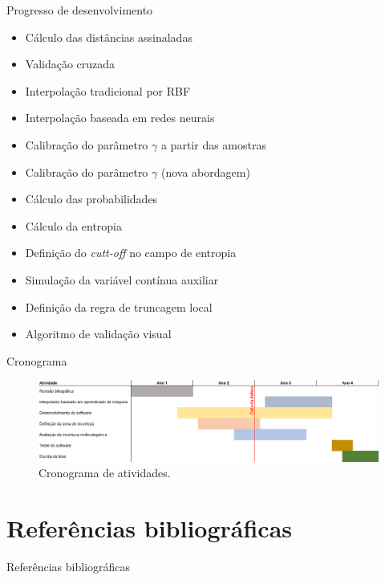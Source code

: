 \documentclass[aspectratio=169]{beamer}
\begin{document}
\begin{frame}{Progresso de desenvolvimento}
	\begin{itemize}

			\item Cálculo das distâncias assinaladas \checkmark
			\item Validação cruzada \checkmark
			\item Interpolação tradicional por RBF \checkmark
			\item Interpolação baseada em redes neurais
			\item Calibração do parâmetro $\gamma$ a partir das amostras \checkmark
			\item Calibração do parâmetro $\gamma$ (nova abordagem)
			\item Cálculo das probabilidades \checkmark
			\item Cálculo da entropia \checkmark
			\item Definição do \textit{cutt-off} no campo de entropia
			\item Simulação da variável contínua auxiliar
			\item Definição da regra de truncagem local
			\item Algoritmo de validação visual

	\end{itemize}
\end{frame}

\begin{frame}{Cronograma}
	\begin{figure}[H]
		\caption{\label{cronograma}Cronograma de atividades.}
		\begin{center}
			\includegraphics[width=\textwidth]{capitulo_3/cronograma_novo.png}
		\end{center}
	\end{figure}
\end{frame}


\section{Referências bibliográficas}

\begin{frame}[allowframebreaks]{Referências bibliográficas}
	
	
\end{frame}
\end{document}
